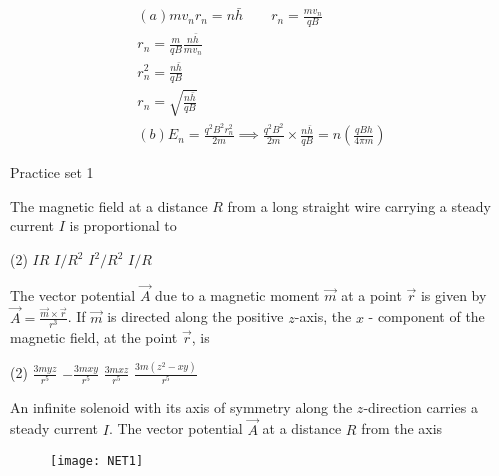 \begin{answer}
\begin{align*}
(a)mv_nr_n=n\bar{h} \quad \quad r_n=\frac{mv_n}{qB}\\
r_n=\frac{m}{qB}\frac{n\bar{h}}{mv_n}\\
r_n^2=\frac{n\bar{h}}{qB}\\
r_n=\sqrt{\frac{n\bar{h}}{qB}}\\
(b) E_n=\frac{q^2B^2r^2_n}{2m}\implies \frac{q^2B^2}{2m}\times\frac{n\bar{h}}{qB}=n\left( \frac{qBh}{4\pi m}\right)  
\end{align*}
\end{answer}
\newpage
\begin{abox}
	Practice set 1
	\end{abox}
\begin{enumerate}
\begin{minipage}{\textwidth}
	\item The magnetic field at a distance $R$ from a long straight wire carrying a steady current $I$ is proportional to
\end{minipage}
\begin{tasks}(2)
	\task[\textbf{A.}] $I R$
	\task[\textbf{B.}] $I / R^{2}$
	\task[\textbf{C.}]$I^{2} / R^{2}$
	\task[\textbf{D.}]$I / R$
\end{tasks}
\begin{minipage}{\textwidth}
	\item The vector potential $\vec{A}$ due to a magnetic moment $\vec{m}$ at a point $\vec{r}$ is given by $\vec{A}=\frac{\vec{m} \times \vec{r}}{r^{3}}$.
	If $\vec{m}$ is directed along the positive $z$-axis, the $x$ - component of the magnetic field, at the point $\vec{r}$, is
\end{minipage}
\begin{tasks}(2)
	\task[\textbf{A.}] $\frac{3 m y z}{r^{5}}$
	\task[\textbf{B.}] $-\frac{3 m x y}{r^{5}}$
	\task[\textbf{C.}]$\frac{3 m x z}{r^{5}}$
	\task[\textbf{D.}]$\frac{3 m\left(z^{2}-x y\right)}{r^{5}}$
\end{tasks}
\begin{minipage}{\textwidth}
	\item An infinite solenoid with its axis of symmetry along the $z$-direction carries a steady current $I$.
	The vector potential $\vec{A}$ at a distance $R$ from the axis
	\begin{figure}[H]
		\centering
		\texttt{[image: NET1]}
	\end{figure}

\end{minipage}
\end{enumerate}
